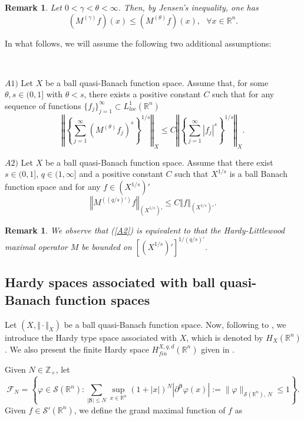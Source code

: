 \documentclass[oneside,10pt]{article}
\newtheorem{remark}[theorem]{Remark}
\begin{document}
\begin{remark} \label{Jensen}
Let $0 < \gamma < \theta < \infty$. Then, by Jensen's inequality, one has
\[
(M^{(\gamma)}f)(x) \leq (M^{(\theta)}f)(x), \,\,\,\, \forall x \in \mathbb{R}^n.
\]
\end{remark}


In what follows, we will assume the following two additional assumptions:

\

$A1)$ Let $X$ be a ball quasi-Banach function space. Assume that, for some $\theta, s \in (0, 1]$ with $\theta < s$, there exists a positive constant $C$ such that for any sequence of functions $\{ f_j \}_{j=1}^{\infty} \subset L^{1}_{loc}(\mathbb{R}^n)$
\begin{equation} \label{A1}
\left\Vert  \left\{ \sum_{j=1}^{\infty} (M^{(\theta)} f_j)^{s} \right\}^{1/s} \right\Vert_{X} \leq C
\left\Vert \left\{ \sum_{j=1}^{\infty} |f_j|^{s} \right\}^{1/s}  \right\Vert_{X}.
\end{equation}

$A2)$ Let $X$ be a ball quasi-Banach function space. Assume that there exist $s \in (0, 1]$, $q \in (1, \infty]$ and a positive constant $C$ such that $X^{1/s}$ is a ball Banach function space and for any $f \in (X^{1/s})'$
\begin{equation} \label{A2}
\left\Vert  M^{((q/s)')} f \right\Vert_{(X^{1/s})'} \leq C \left\Vert f  \right\Vert_{(X^{1/s})'}.
\end{equation}

\begin{remark} \label{cond equiv A2}
We observe that (\ref{A2}) is equivalent to that the Hardy-Littlewood maximal operator $M$ be bounded on $[(X^{1/s})']^{1/(q/s)'}$.
\end{remark}

\subsection{Hardy spaces associated with ball quasi-Banach function spaces} Let $(X, \Vert \cdot \Vert_X)$ be a ball quasi-Banach function space. Now, following to \cite{sawa}, we introduce the Hardy type space associated with $X$, which is denoted by $H_{X}(\mathbb{R}^n)$. We also present the finite Hardy space $H^{X, q, d}_{fin}(\mathbb{R}^n)$ given in \cite{Yan}.

Given $N \in \mathbb{Z}_{+}$, let 
\[
\mathcal{F}_{N}=\left\{ \varphi \in \mathcal{S}(\mathbb{R}^{n}):\sum\limits_{\left\vert \mathbf{\beta }\right\vert \leq N}\sup\limits_{x\in \mathbb{R}^{n}}\left( 1+\left\vert x\right\vert \right)^{N}\left\vert \partial^{\mathbf{\beta }}
\varphi(x) \right\vert := \| \varphi \|_{\mathcal{S}(\mathbb{R}^{n}), \, N}  \leq 1\right\}.
\] 
Given $f \in \mathcal{S}'(\mathbb{R}^{n})$, we define the grand maximal function of $f$ as 
\end{document}
